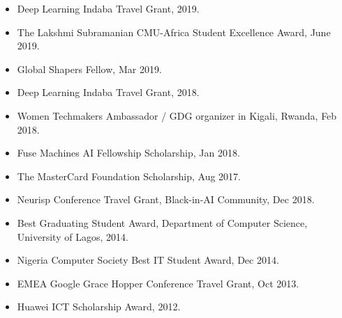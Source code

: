 \begin{itemize}
    \item Deep Learning Indaba Travel Grant, 2019.
    \item The Lakshmi Subramanian CMU-Africa Student Excellence Award, June 2019.
    \item Global Shapers Fellow, Mar 2019.
    \item Deep Learning Indaba Travel Grant, 2018.
    \item Women Techmakers Ambassador / GDG organizer in Kigali, Rwanda, Feb 2018. 
    \item Fuse Machines AI Fellowship Scholarship, Jan 2018.
    \item The MasterCard Foundation Scholarship, Aug 2017.
    \item Neurisp Conference Travel Grant, Black-in-AI Community, Dec 2018.
    \item Best Graduating Student Award, Department of Computer Science, University of Lagos, 2014.
    \item Nigeria Computer Society Best IT Student Award, Dec 2014.
    \item EMEA Google Grace Hopper Conference Travel Grant, Oct 2013.
    \item Huawei ICT Scholarship Award, 2012.
    
\end{itemize}







